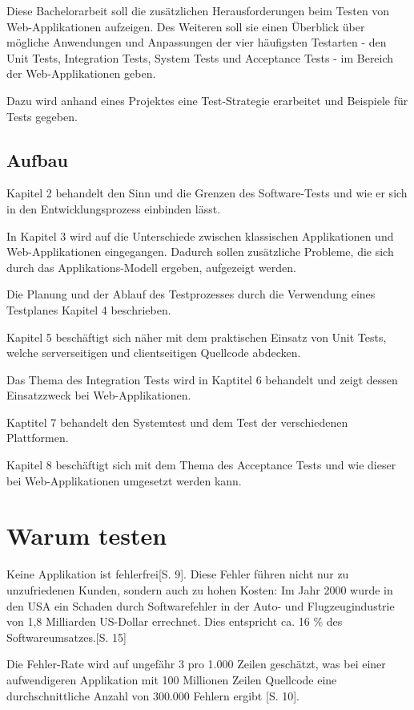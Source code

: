 \documentclass[a4paper,bibtotoc,oneside]{scrbook}
\begin{document}
Diese Bachelorarbeit soll die zusätzlichen Herausforderungen beim Testen von Web-Applikationen aufzeigen. Des Weiteren soll sie einen Überblick über mögliche Anwendungen und Anpassungen der vier häufigsten Testarten - den Unit Tests, Integration Tests, System Tests und Acceptance Tests - im Bereich der Web-Applikationen geben.

Dazu wird anhand eines Projektes eine Test-Strategie erarbeitet und Beispiele für Tests gegeben.


\section{Aufbau}
Kapitel 2 behandelt den Sinn und die Grenzen des Software-Tests und wie er sich in den Entwicklungsprozess einbinden lässt.

In Kapitel 3 wird auf die Unterschiede zwischen klassischen Applikationen und Web-Applikationen eingegangen. Dadurch sollen zusätzliche Probleme, die sich durch das Applikations-Modell ergeben, aufgezeigt werden.

Die Planung und der Ablauf des Testprozesses durch die Verwendung eines Testplanes Kapitel 4 beschrieben.

Kapitel 5 beschäftigt sich näher mit dem praktischen Einsatz von Unit Tests, welche serverseitigen und clientseitigen Quellcode abdecken.

Das Thema des Integration Tests wird in Kaptitel 6 behandelt und zeigt dessen Einsatzzweck bei Web-Applikationen.

Kaptitel 7 behandelt den Systemtest und dem Test der verschiedenen Plattformen.

Kapitel 8 beschäftigt sich mit dem Thema des Acceptance Tests und wie dieser bei Web-Applikationen umgesetzt werden kann.

\chapter{Warum testen}
Keine Applikation ist fehlerfrei\cite{empiric_invest}[S. 9]. Diese Fehler  führen nicht nur zu unzufriedenen Kunden, sondern auch zu hohen Kosten: \glqq Im Jahr 2000 wurde in den USA ein Schaden durch Softwarefehler in der Auto- und Flugzeugindustrie von 1,8 Milliarden US-Dollar errechnet. Dies entspricht ca. 16 \% des Softwareumsatzes.\grqq\cite{betrieb}[S. 15]

Die Fehler-Rate wird auf ungefähr 3 pro 1.000 Zeilen geschätzt, was bei einer aufwendigeren Applikation mit 100 Millionen Zeilen Quellcode eine durchschnittliche Anzahl von 300.000 Fehlern ergibt \cite{eval_regression}[S. 10]. 
\end{document}
